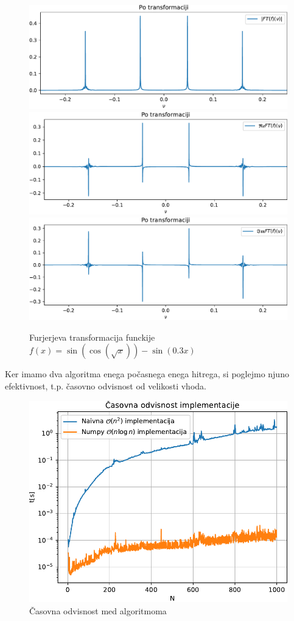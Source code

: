 \begin{figure}[h]
    \centering
    \includegraphics[width=13cm]{pdfs/po.pdf}
    \includegraphics[width=13cm]{pdfs/real.pdf}
    \includegraphics[width=13cm]{pdfs/imag.pdf}    
    \caption{Furjerjeva transformacija funckije $f(x) = \sin(\cos(\sqrt{x}))-\sin(0.3x)$}
\end{figure}
\newpage
Ker imamo dva algoritma enega počasnega enega hitrega, si poglejmo njuno efektivnost, t.p. časovno odvisnost od velikosti vhoda.
\begin{figure}[h]
    \centering
    \includegraphics[width=12cm]{pdfs/t(N).pdf}
    \caption{Časovna odvisnost med algoritmoma}
\end{figure}

